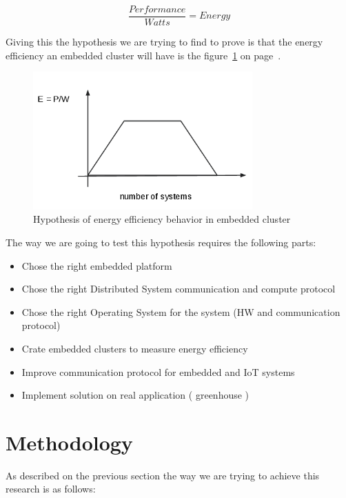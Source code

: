 \begin{equation}
    \dfrac {Performance}{Watts} = Energy
\end{equation}

Giving this the hypothesis we are trying to find to prove is that the energy
efficiency an embedded cluster will have is the 
figure~\ref{fig:1.2} on page~\pageref{fig:1.2}.


\begin{figure}[H]
\centering
\includegraphics[width=0.75\textwidth]{images/graph_1.png}
\caption{Hypothesis of energy efficiency behavior in embedded cluster}
\label{fig:1.2}
\end{figure}

The way we are going to test this hypothesis requires the following parts:


\begin{itemize}
\item Chose the right embedded platform 
\item Chose the right Distributed System communication and compute protocol
\item Chose the right Operating System for the system (HW and communication protocol) 
\item Crate embedded clusters to measure energy efficiency
\item Improve communication protocol for embedded and IoT systems
\item Implement solution on real application ( greenhouse )
\end{itemize}

\section{Methodology}
\noindent

As described on the previous section the way we are trying to achieve this
research is as follows: 


